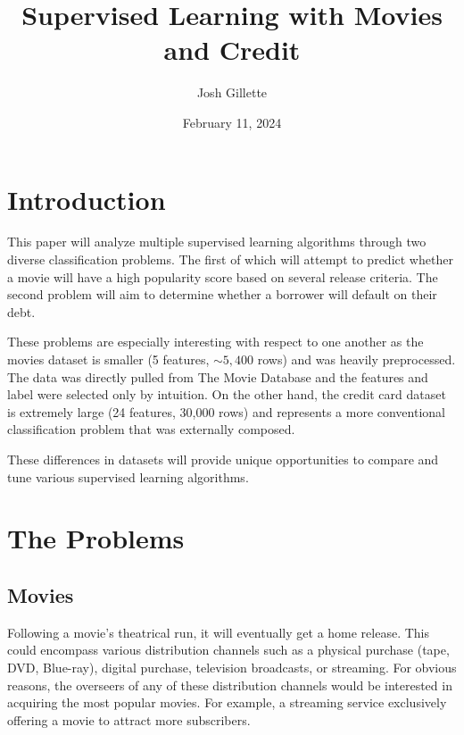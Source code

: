 \documentclass{article}
\title{Supervised Learning with Movies and Credit}
\author{Josh Gillette}
\date{February 11, 2024}
\begin{document}
\maketitle

\section{Introduction}

This paper will analyze multiple supervised learning algorithms through two diverse classification problems. The first of which will attempt to predict whether a movie will have a high popularity score based on several release criteria. The second problem will aim to determine whether a borrower will default on their debt.

These problems are especially interesting with respect to one another as the movies dataset is smaller (5 features, $\sim5,400$ rows) and was heavily preprocessed. The data was directly pulled from The Movie Database and the features and label were selected only by intuition. On the other hand, the credit card dataset is extremely large (24 features, 30,000 rows) and represents a more conventional classification problem that was externally composed.

These differences in datasets will provide unique opportunities to compare and tune various supervised learning algorithms.

\section{The Problems}

\subsection{Movies}

Following a movie's theatrical run, it will eventually get a home release. This could encompass various distribution channels such as a physical purchase (tape, DVD, Blue-ray), digital purchase, television broadcasts, or streaming. For obvious reasons, the overseers of any of these distribution channels would be interested in acquiring the most popular movies. For example, a streaming service exclusively offering a movie to attract more subscribers.
\end{document}
